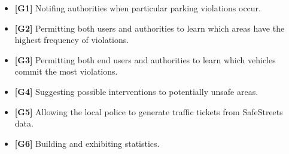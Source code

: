 \begin{itemize}

\item \textbf{[\hypertarget{G1}{G1}]} Notifing authorities when particular parking violations occur.

\item \textbf{[\hypertarget{G2}{G2}]} Permitting both users and authorities to learn which areas have the highest frequency of violations.

\item \textbf{[\hypertarget{G3}{G3}]} Permitting both end users and authorities to learn which vehicles commit the most violations.

\item \textbf{[\hypertarget{G4}{G4}]} Suggesting possible interventions to potentially unsafe areas.

\item \textbf{[\hypertarget{G5}{G5}]} Allowing the local police to generate traffic tickets from SafeStreets data.

\item \textbf{[\hypertarget{G6}{G6}]} Building and exhibiting statistics.

\end{itemize}